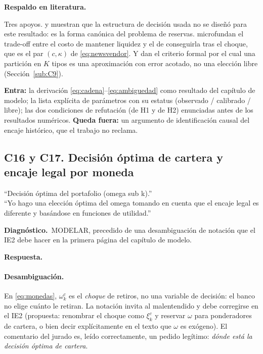 \documentclass[11pt]{article}
\newcommand{\diag}[1]{\par\noindent\textbf{Diagn\'ostico.}\ #1\par}
\newcommand{\resp}{\par\noindent\textbf{Respuesta.}\par}
\newcommand{\lit}{\par\noindent\textbf{Respaldo en literatura.}\par}
\theoremstyle{definition}
\begin{document}
\lit
Tres apoyos. \citet{poole1968} y \citet{baltensperger1980} muestran que la
estructura de decisi\'on usada no se dise\~n\'o para este resultado: es la forma
can\'onica del problema de reservas. \citet{bianchibigio2022} microfundan el
trade-off entre el costo de mantener liquidez y el de conseguirla tras el choque,
que es el par $(c,\kappa)$ de \eqref{eq:newsvendor}. Y
\citet{bonhomme2022} dan el criterio formal por el cual una partici\'on en $K$
tipos es una aproximaci\'on con error acotado, no una elecci\'on libre
(Secci\'on~\ref{sub:C9}).

\begin{ie2}
\textbf{Entra:} la derivaci\'on \eqref{eq:cadena}--\eqref{eq:ambiguedad} como
resultado del cap\'itulo de modelo; la lista expl\'icita de par\'ametros con su
estatus (observado / calibrado / libre); las dos condiciones de refutaci\'on (de
H1 y de H2) enunciadas antes de los resultados num\'ericos.
\textbf{Queda fuera:} un argumento de identificaci\'on causal del encaje
hist\'orico, que el trabajo no reclama.
\end{ie2}

\subsection{C16 y C17. Decisi\'on \'optima de cartera y encaje legal por moneda}
\label{sub:C16}

\begin{jurado}
``Decisi\'on \'optima del portafolio (omega sub k).''\\[1mm]
``Yo hago una elecci\'on \'optima del omega tomando en cuenta que el encaje legal
es diferente y bas\'andose en funciones de utilidad.''
\end{jurado}

\diag{MODELAR, precedido de una desambiguaci\'on de notaci\'on que el IE2 debe
hacer en la primera p\'agina del cap\'itulo de modelo.}

\resp

\paragraph{Desambiguaci\'on.} En \eqref{eq:monedas}, $\omega^c_k$ es el
\emph{choque} de retiros, no una variable de decisi\'on: el banco no elige cu\'anto
le retiran. La notaci\'on invita al malentendido y debe corregirse en el IE2
(propuesta: renombrar el choque como $\xi^c_k$ y reservar $\omega$ para
ponderadores de cartera, o bien decir expl\'icitamente en el texto que $\omega$ es
exógeno). El comentario del jurado es, le\'ido correctamente, un pedido
leg\'itimo: \emph{d\'onde est\'a la decisi\'on \'optima de cartera}.
\end{document}
